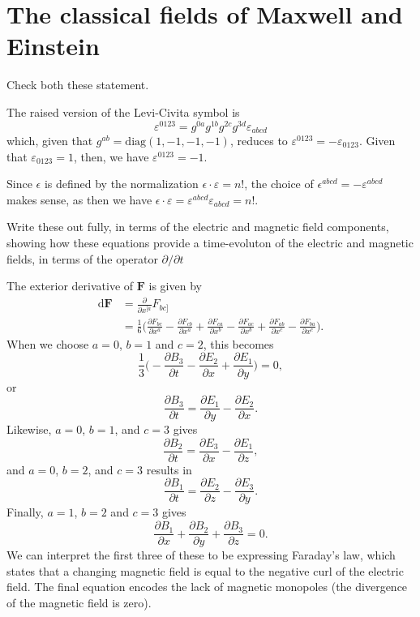 \documentclass[../road-to-reality.tex]{subfiles}
\begin{document}
\section{The classical fields of Maxwell and Einstein}

\begin{questions}

\question Check both these statement.

  \begin{solution}
    The raised version of the Levi-Civita symbol is
    \[
      \varepsilon^{0123} = g^{0a}g^{1b}g^{2c}g^{3d}\varepsilon_{abcd}
    \]
    which, given that $g^{ab}=\mathrm{diag}(1,-1,-1,-1)$, reduces to $\varepsilon^{0123}=-\varepsilon_{0123}$. Given that $\varepsilon_{0123}=1$, then, we have $\varepsilon^{0123}=-1$.

    Since $\epsilon$ is defined by the normalization $\epsilon\cdot\varepsilon = n!$, the choice of $\epsilon^{abcd}=-\varepsilon^{abcd}$ makes sense, as then we have $\epsilon\cdot\varepsilon = \varepsilon^{abcd}\varepsilon_{abcd}=n!$.
  \end{solution}

\question Write these out fully, in terms of the electric and magnetic field components, showing how these equations provide a time-evoluton of the electric and magnetic fields, in terms of the operator $\partial/\partial{t}$

  \begin{solution}
    The exterior derivative of $\mathbf{F}$ is given by
    \begin{align*}
      \mathrm{d}\mathbf{F} &= \frac{\partial}{\partial{x^{[a}}}F_{bc]} \\
                           &= \frac{1}{6}\Big(\frac{\partial{F_{bc}}}{\partial{x^a}} - \frac{\partial{F_{cb}}}{\partial{x^a}} + \frac{\partial{F_{ca}}}{\partial{x^b}} - \frac{\partial{F_{ac}}}{\partial{x^b}} + \frac{\partial{F_{ab}}}{\partial{x^c}} - \frac{\partial{F_{ba}}}{\partial{x^c}}\Big).
    \end{align*}
    When we choose $a = 0$, $b = 1$ and $c = 2$, this becomes
    \[
      \frac{1}{3}\Big(-\frac{\partial{B_3}}{\partial{t}} -
      \frac{\partial{E_2}}{\partial{x}} + \frac{\partial{E_1}}{\partial{y}}\Big)
      = 0,
    \]
    or
    \[
      \frac{\partial{B_3}}{\partial{t}} = \frac{\partial{E_1}}{\partial{y}} - \frac{\partial{E_2}}{\partial{x}}.
    \]
    Likewise, $a=0$, $b=1$, and $c=3$ gives
    \[
      \frac{\partial{B_2}}{\partial{t}} =
      \frac{\partial{E_3}}{\partial{x}} - \frac{\partial{E_1}}{\partial{z}},
    \]
    and $a=0$, $b=2$, and $c=3$ results in
    \[
      \frac{\partial{B_1}}{\partial{t}} = \frac{\partial{E_2}}{\partial{z}}
      - \frac{\partial{E_3}}{\partial{y}}.
    \]
    Finally, $a=1$, $b=2$ and $c=3$ gives
    \[
      \frac{\partial{B_1}}{\partial{x}} + \frac{\partial{B_2}}{\partial{y}} +
      \frac{\partial{B_3}}{\partial{z}} = 0.
    \]
    We can interpret the first three of these to be expressing Faraday's law,
    which states that a changing magnetic field is equal to the negative curl of the
    electric field. The final equation encodes the lack of magnetic monopoles
    (the divergence of the magnetic field is zero).


\end{solution}
\end{questions}
\end{document}

